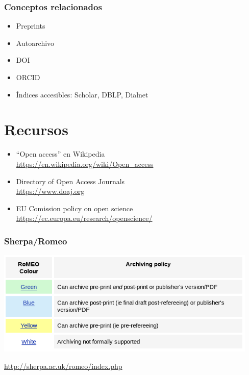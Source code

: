 \documentclass[17pt,aspectratio=169]{beamer}
\begin{document}
\begin{frame}
\frametitle{Conceptos relacionados}

\begin{itemize}
\item Preprints
\item Autoarchivo
\item DOI
\item ORCID
\item Índices accesibles: Scholar, DBLP, Dialnet
\end{itemize}

\end{frame}


\section{Recursos}

\begin{frame}

  \begin{itemize}
  \item ``Open access'' en Wikipedia \\
    {\small \url{https://en.wikipedia.org/wiki/Open_access}}
  \item Directory of Open Access Journals \\
    {\small \url{https://www.doaj.org}}
  \item EU Comission policy on open science \\
    {\small \url{https://ec.europa.eu/research/openscience/}}
  \end{itemize}

\end{frame}

\begin{frame}
\frametitle{Sherpa/Romeo}

\begin{center}
  \includegraphics[width=12.5cm]{figs/sherpa-romeo}
\end{center}  

\begin{flushright}
{\small \url{http://sherpa.ac.uk/romeo/index.php}}
\end{flushright}

\end{frame}
\end{document}
